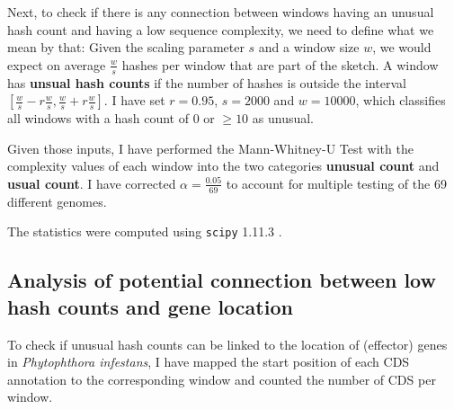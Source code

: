 Next, to check if there is any connection between windows having an unusual hash
count and having a low sequence complexity, we need to define what we mean by
that: Given the scaling parameter $s$ and a window size $w$, we would expect on
average $\frac{w}{s}$ hashes per window that are part of the sketch. A window
has \textbf{unsual hash counts} if the number of hashes is outside the interval
$[\frac{w}{s} - r \frac{w}{s}, \frac{w}{s} + r \frac{w}{s}]$. I have set
$r=0.95$, $s=2000$ and $w=10000$, which classifies all windows with a hash count
of $0$ or $\geq 10$ as unusual.

Given those inputs, I have performed the Mann-Whitney-U Test
\cite{mannTestWhetherOne1947,wilcoxonIndividualComparisonsRanking1945} with the
complexity values of each window into the two categories \textbf{unusual count}
and \textbf{usual count}. I have corrected $\alpha = \frac{0.05}{69}$ to account
for multiple testing of the 69 different genomes.

The statistics were computed using \texttt{scipy} 1.11.3
\cite{virtanenSciPyFundamentalAlgorithms2020}.

\subsection*{Analysis of potential connection between low hash counts and gene location}
To check if unusual hash counts can be linked to the location of (effector)
genes in \textit{Phytophthora infestans}, I have mapped the start position of
each CDS annotation to the corresponding window and counted the number of CDS
per window.